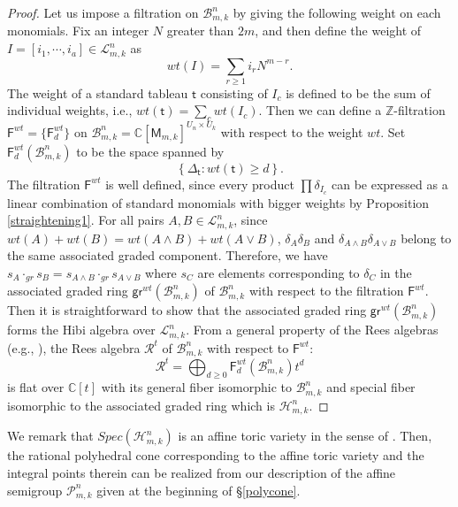 \documentclass[11pt]{amsart}
\numberwithin{equation}{subsection}
\begin{document}
\begin{proof}
Let us impose a filtration on $\mathcal{B}_{m,k}^{n}$ by giving the
following weight on each monomials. Fix an integer $N$ greater than $2m$,
and then define the weight of $I=[i_{1},\cdots ,i_{a}]\in \mathcal{L}_{m,k}^{n}$ as
\begin{equation}
wt(I)=\sum_{r\geq 1}i_{r}N^{m-r}.  \label{def weight}
\end{equation}
The weight of a standard tableau $\mathsf{t}$ consisting of $I_{c}$ is
defined to be the sum of individual weights, i.e., 
$wt(\mathsf{t})=\sum_{c}wt(I_{c})$. Then we can define a $\mathbb{Z}$-filtration 
$\mathsf{F}^{wt}=\{\mathsf{F}_{d}^{wt}\}$ on 
$\mathcal{B}_{m,k}^{n}=\mathbb{C}[\mathsf{M}_{m,k}]^{U_{n}\times U_{k}}$ with respect to 
the weight $wt$. Set $\mathsf{F}_{d}^{wt}(\mathcal{B}_{m,k}^{n})$ to be the space spanned by
\begin{equation*}
\left\{ \Delta _{\mathsf{t}}:wt(\mathsf{t})\geq d\right\} .
\end{equation*}
The filtration $\mathsf{F}^{wt}$ is well defined, since every product 
$\prod \delta _{I_{c}}$ can be expressed as a linear combination of standard
monomials with bigger weights by Proposition \ref{straightening1}. For all pairs 
$A,B\in \mathcal{L}_{m,k}^{n}$, since $wt(A)+wt(B)=wt(A\wedge B)+wt(A\vee B)$,
 $\delta _{A}\delta _{B}$ and $\delta _{A\wedge B}\delta _{A\vee B}$ belong
to the same associated graded component. Therefore, we have 
$s_{A}\cdot_{gr}s_{B}=s_{A\wedge B}\cdot _{gr}s_{A\vee B}$ where $s_{C}$ are elements
corresponding to $\delta _{C}$ in the associated graded ring 
$\mathsf{gr}^{wt}(\mathcal{B}_{m,k}^{n})$ of $\mathcal{B}_{m,k}^{n}$ with respect to 
the filtration $\mathsf{F}^{wt}$. Then it is straightforward to show that the
associated graded ring $\mathsf{gr}^{wt}(\mathcal{B}_{m,k}^{n})$ forms the
Hibi algebra over $\mathcal{L}_{m,k}^{n}$. From a general property of the
Rees algebras (e.g., \cite{AB04}), the Rees algebra $\mathcal{R}^{t}$ of 
$\mathcal{B}_{m,k}^{n}$ with respect to $\mathsf{F}^{wt}$:
\begin{equation*}
\mathcal{R}^{t}=\bigoplus_{d\geq 0}\mathsf{F}_{d}^{wt}(\mathcal{B}_{m,k}^{n})t^{d}
\end{equation*}
is flat over $\mathbb{C}[t]$ with its general fiber isomorphic to 
$\mathcal{B}_{m,k}^{n}$ and special fiber isomorphic to the associated graded ring
which is $\mathcal{H}_{m,k}^{n}$.
\end{proof}

We remark that $Spec(\mathcal{H}_{m,k}^{n})$ is an affine toric variety in the
sense of \cite{St95}. Then, the rational polyhedral cone corresponding to the affine 
toric variety and the integral points therein can be realized from 
our description of the affine semigroup $\mathcal{P}_{m,k}^n$ given at 
the beginning of \S \ref{polycone}.
\end{document}
